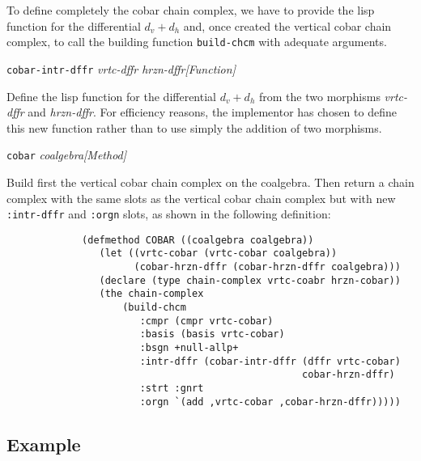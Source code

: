 To define completely the cobar chain complex, 
we have to provide the lisp function
for the differential $d_v + d_h$ and, once created the vertical cobar chain complex,
to call the building function {\tt build-chcm} with adequate arguments.
\vskip 0.45cm
{\parindent=0mm
{\leftskip=5mm 
{\tt cobar-intr-dffr} {\em vrtc-dffr hrzn-dffr}\hfill {\em [Function]} \par}
{\leftskip=15mm 
Define the lisp function for the differential $d_v+d_h$ from the two morphisms
{\em vrtc-dffr} and {\em hrzn-dffr}. For efficiency reasons, the implementor
has chosen to define this new function rather than to use simply
the addition of two morphisms.\par}
{\leftskip=5mm 
{\tt cobar} {\em coalgebra}\hfill {\em [Method]} \par}
{\leftskip=15mm 
Build first the vertical cobar chain complex on the coalgebra. Then return a chain complex
with the same slots as the vertical cobar chain complex but with new {\tt :intr-dffr}
and  {\tt :orgn} slots, as shown in the following definition: \par}
}
\newpage
{\footnotesize\begin{verbatim}
             (defmethod COBAR ((coalgebra coalgebra))
                (let ((vrtc-cobar (vrtc-cobar coalgebra))
                      (cobar-hrzn-dffr (cobar-hrzn-dffr coalgebra)))
                (declare (type chain-complex vrtc-coabr hrzn-cobar))
                (the chain-complex
                    (build-chcm
                       :cmpr (cmpr vrtc-cobar)
                       :basis (basis vrtc-cobar)
                       :bsgn +null-allp+
                       :intr-dffr (cobar-intr-dffr (dffr vrtc-cobar) 
                                                   cobar-hrzn-dffr)
                       :strt :gnrt
                       :orgn `(add ,vrtc-cobar ,cobar-hrzn-dffr)))))
\end{verbatim}}

\subsection* {Example}

